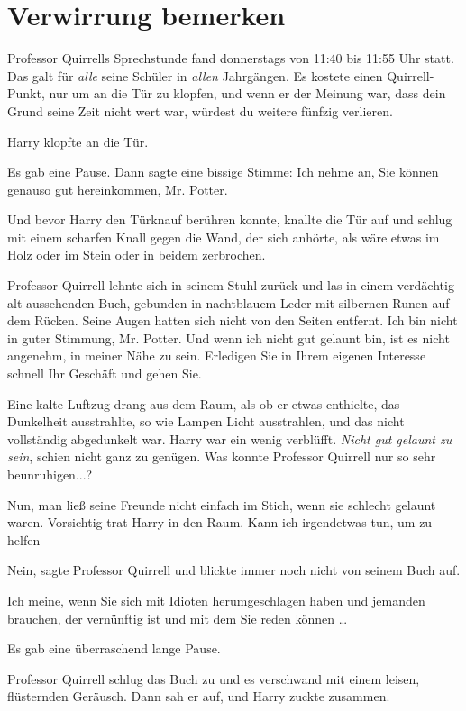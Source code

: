 \chapter{Verwirrung bemerken}

Professor Quirrells Sprechstunde fand donnerstags von 11:40 bis 11:55 Uhr statt.
Das galt für \emph{alle} seine Schüler in \emph{allen} Jahrgängen. Es kostete
einen Quirrell-Punkt, nur um an die Tür zu klopfen, und wenn er der Meinung war,
dass dein Grund seine Zeit nicht wert war, würdest du weitere fünfzig verlieren.

Harry klopfte an die Tür.

Es gab eine Pause. Dann sagte eine bissige Stimme: \glqq{}Ich nehme an, Sie
können genauso gut hereinkommen, Mr. Potter.\grqq{}

Und bevor Harry den Türknauf berühren konnte, knallte die Tür auf und schlug mit
einem scharfen Knall gegen die Wand, der sich anhörte, als wäre etwas im Holz
oder im Stein oder in beidem zerbrochen.

Professor Quirrell lehnte sich in seinem Stuhl zurück und las in einem
verdächtig alt aussehenden Buch, gebunden in nachtblauem Leder mit silbernen
Runen auf dem Rücken. Seine Augen hatten sich nicht von den Seiten entfernt.
\glqq{}Ich bin nicht in guter Stimmung, Mr. Potter. Und wenn ich nicht gut
gelaunt bin, ist es nicht angenehm, in meiner Nähe zu sein. Erledigen Sie in
Ihrem eigenen Interesse schnell Ihr Geschäft und gehen Sie.\grqq{}

Eine kalte Luftzug drang aus dem Raum, als ob er etwas enthielte, das Dunkelheit
ausstrahlte, so wie Lampen Licht ausstrahlen, und das nicht vollständig
abgedunkelt war. Harry war ein wenig verblüfft. \emph{Nicht gut gelaunt zu
sein}, schien nicht ganz zu genügen. Was konnte Professor Quirrell nur so sehr
beunruhigen...?

Nun, man ließ seine Freunde nicht einfach im Stich, wenn sie schlecht gelaunt
waren. Vorsichtig trat Harry in den Raum. \glqq{}Kann ich irgendetwas tun, um zu
helfen -\grqq{}

\glqq{}Nein\grqq{}, sagte Professor Quirrell und blickte immer noch nicht von
seinem Buch auf.

\glqq{}Ich meine, wenn Sie sich mit Idioten herumgeschlagen haben und jemanden
brauchen, der vernünftig ist und mit dem Sie reden können …\grqq{}

Es gab eine überraschend lange Pause.

Professor Quirrell schlug das Buch zu und es verschwand mit einem leisen,
flüsternden Geräusch. Dann sah er auf, und Harry zuckte zusammen.

